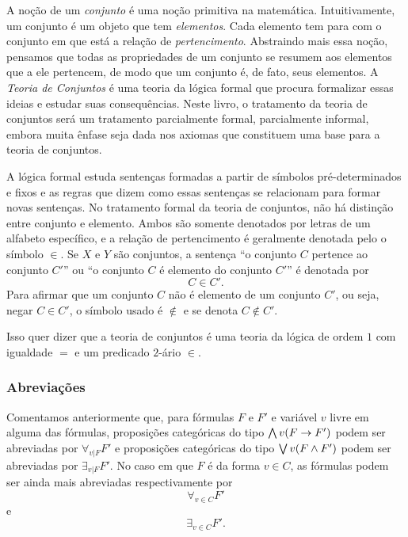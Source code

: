 A noção de um \emph{conjunto} é uma noção primitiva na matemática. Intuitivamente, um conjunto é um objeto que tem \emph{elementos}. Cada elemento tem para com o conjunto em que está a relação de \emph{pertencimento}. Abstraindo mais essa noção, pensamos que todas as propriedades de um conjunto se resumem aos elementos que a ele pertencem, de modo que um conjunto é, de fato, seus elementos. A \emph{Teoria de Conjuntos} é uma teoria da lógica formal que procura formalizar essas ideias e estudar suas consequências. Neste livro, o tratamento da teoria de conjuntos será um tratamento parcialmente formal, parcialmente informal, embora muita ênfase seja dada nos axiomas que constituem uma base para a teoria de conjuntos.

A lógica formal estuda sentenças formadas a partir de símbolos pré-determinados e fixos e as regras que dizem como essas sentenças se relacionam para formar novas sentenças. No tratamento formal da teoria de conjuntos, não há distinção entre conjunto e elemento. Ambos são somente denotados por letras de um alfabeto específico, e a relação de pertencimento é geralmente denotada pelo o símbolo $\in$. Se $X$ e $Y$ são conjuntos, a sentença ``o conjunto $C$ pertence ao conjunto $C'$'' ou ``o conjunto $C$ é elemento do conjunto $C'$'' é denotada por 
	\begin{equation*}
	C \in C'.
	\end{equation*}
Para afirmar que um conjunto $C$ não é elemento de um conjunto $C'$, ou seja, negar $C \in C'$, o símbolo usado é $\notin$ e se denota $C \notin C'$.

Isso quer dizer que a teoria de conjuntos é uma teoria da lógica de ordem $1$ com igualdade $=$ e um predicado $2$-ário $\in$.

\subsubsection{Abreviações}

Comentamos anteriormente que, para fórmulas $F$ e $F'$ e variável $v$ livre em alguma das fórmulas, proposições categóricas do tipo $\bigwedge\nolimits v(F \rightarrow F')$ podem ser abreviadas por $\forall_{v | F} F'$ e proposições categóricas do tipo $\bigvee\nolimits v(F \land F')$ podem ser abreviadas por $\exists_{v | F} F'$. No caso em que $F$ é da forma $v \in C$, as fórmulas podem ser ainda mais abreviadas respectivamente por
	\begin{equation*}
	\forall_{v \in C} F'
	\end{equation*}
e
	\begin{equation*}
	\exists_{v \in C} F'.
	\end{equation*}

